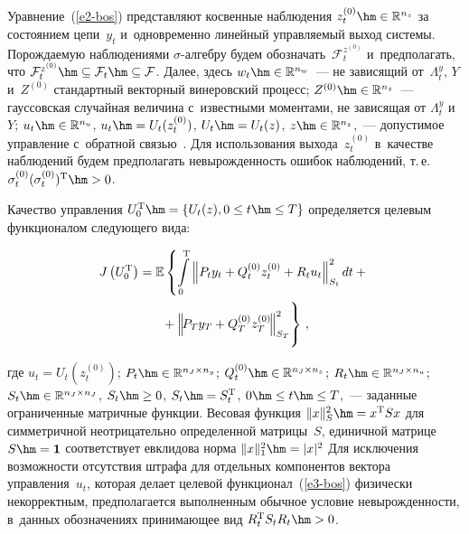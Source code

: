 \begin{multicols}{2}
   \vspace*{-2pt}
     
     Уравнение~(\ref{e2-bos}) представляют косвенные наблюдения 
     $z_t^{(0)}\hm\in \mathbb{R}^{n_z}$ за состоянием цепи~$y_t$ 
и~одновременно линейный управляемый выход системы. Порождаемую 
наблюдениями $\sigma$-ал\-геб\-ру будем 
обозначать~$\mathcal{F}_t^{z^{(0)}}$ и~предполагать, что 
$\mathcal{F}_t^{z^{(0)}} \hm\subseteq \mathcal{F}_t\hm\subseteq 
\mathcal{F}$. Далее, здесь $w_t\hm\in \mathbb{R}^{n_w}$~--- не зависящий 
от~$\Lambda_t^y$, $Y$ и~$Z^{(0)}$ стандартный векторный винеровский 
процесс; $Z^{(0)}\hm\in \mathbb{R}^{n_z}$~--- гауссовская случайная 
величина с~известными моментами, не зависящая от $\Lambda_t^y$ и~$Y$; 
$u_t\hm\in \mathbb{R}^{n_u}$, $u_t\hm= U_t(z_t^{(0)})$, $U_t\hm= U_t(z)$, 
$z\hm\in \mathbb{R}^{n_z}$,~--- допустимое управление с~обратной 
связью~\cite{5-bos}. Для использования выхода~$z_t^{(0)}$ в~качестве 
наблюдений будем предполагать невырожденность ошибок наблюдений, 
т.\,е.\ $\sigma_t^{(0)}(\sigma_t^{(0)})^{\mathrm{T}}\hm>0$.
     
     Качество управления $U_0^{\mathrm{T}}\hm= \{ U_t(z), 0\leq t\hm\leq T\}$ 
определяется целевым функционалом следующего вида:

\vspace*{-4pt}

\noindent
     \begin{multline}
     J\left(U_0^{\mathrm{T}}\right)=\mathbb{E}\left\{ 
     \int\limits_0^{\mathrm{T}} \left\| P_t y_t+Q_t^{(0)} 
z_t^{(0)} +R_t u_t\right\|^2_{S_t}dt+{}\right.\\
     \left.{}+\left\| \! P_T y_T +Q_T^{(0)} z_T^{(0)}\!\right\|^2_{S_T}\!
     \vphantom{\int\limits_0^{\mathrm{T}}}
     \right\}\,,
     \label{e3-bos}
     \end{multline}
     
     \vspace*{-2pt}
     
\noindent     
где $u_t=U_t(z_t^{(0)})$; $P_t\hm\in \mathbb{R}^{n_J\times n_y}$; 
$Q_t^{(0)}\hm\in \mathbb{R}^{n_J\times n_z}$; $R_t\hm\in 
\mathbb{R}^{n_J\times n_u}$; $S_t\hm\in \mathbb{R}^{n_J\times n_J}$, 
$S_t\hm\geq 0$, $S_t\hm= S_t^{\mathrm{T}}$, $0\hm\leq t\hm\leq T$,~--- заданные 
ограниченные матричные функции. Весовая функция $\|x\|_S^2 \hm= 
x^{\mathrm{T}} Sx$ для симметричной неотрицательно определенной 
мат\-ри\-цы~$S$, единичной матрице $S\hm=\mathbf{1}$ соответствует 
евклидова норма $\| x\|^2_1\hm= \vert x\vert^2$ Для исключения 
возможности отсутствия штрафа для отдельных компонентов вектора 
управления~$u_t$, которая делает целевой функционал~(\ref{e3-bos}) 
физически некорректным, предполагается выполненным обычное условие 
невырожденности, в~данных обозначениях принимающее вид $R_t^{\mathrm{T}} S_t 
R_t\hm>0$.
     

\end{multicols}
